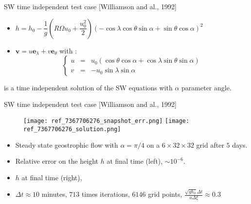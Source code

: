 \documentclass[11pt]{beamer}
\begin{document}

\begin{frame}{SW time independent test case [Williamson and al., 1992]}

\begin{itemize}
\item $h = h_0 - \dfrac{1}{g} \left( R \Omega u_0 + \dfrac{u_0^2}{2} \right)\left( - \cos \lambda \cos \theta \sin \alpha + \sin \theta \cos \alpha \right)^2$
\item $\mathbf{v} = u \mathbf{e}_{\lambda}+ v \mathbf{e}_{\theta}$ with :
\begin{equation*}
\left\lbrace \begin{array}{rcl}
 u & = & u_0 ( \cos \theta \cos \alpha + \cos \lambda \sin \theta \sin \alpha)\\
 v & = & -u_0 \sin \lambda \sin \alpha
 \end{array} \right.
\end{equation*}
\end{itemize}
is a time independent solution of the SW equations with $\alpha$ parameter angle.

\end{frame}


\begin{frame}{SW time independent test case [Williamson and al., 1992]}
\begin{figure}
\texttt{[image: ref\_7367706276\_snapshot\_err.png]}
\texttt{[image: ref\_7367706276\_solution.png]}
\end{figure}
\begin{itemize}
\item Steady state geostrophic flow with $\alpha=\pi/4$ on a $6 \times 32 \times 32$ grid after $5$ days.
\item Relative error on the height $h$ at final time (left), $\sim 10^{-6}$.
\item $h$ at final time (right),
\item $\Delta t \approx 10$ minutes, $713$ times iterations, $6146$ grid points, $\frac{\sqrt{g h_0} \Delta t}{a \Delta \xi } \approx 0.3$
\end{itemize}
\end{frame}
\end{document}

